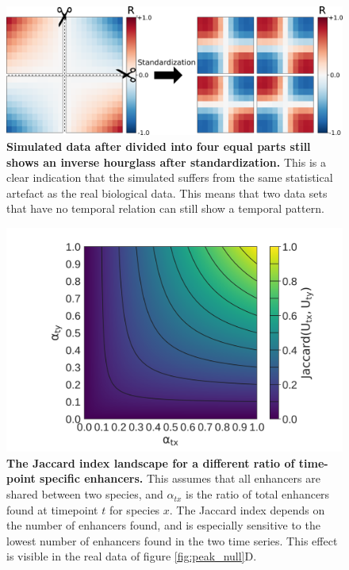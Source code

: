 \begin{figure}[H]
    \includegraphics[width=\linewidth]{ch.hourglass/images/sim_normalisation.png}
    \caption{\textbf{Simulated data after divided into four equal parts still shows an inverse hourglass after standardization.} This is a clear indication that the simulated suffers from the same statistical artefact as the real biological data. This means that two data sets that have no temporal relation can still show a temporal pattern.}
    \label{fig:sim_normalisation}
\end{figure}

\begin{figure}[H]
    \includegraphics[width=\linewidth]{ch.hourglass/images/math_flies.png}
    \caption{\textbf{The Jaccard index landscape for a different ratio of time-point specific enhancers.} This assumes that all enhancers are shared between two species, and $\alpha_{tx}$ is the ratio of total enhancers found at timepoint $t$ for species $x$. The Jaccard index depends on the number of enhancers found, and is especially sensitive to the lowest number of enhancers found in the two time series. This effect is visible in the real data of figure \ref{fig:peak_null}D. }
    \label{fig:peak_math}
\end{figure}

